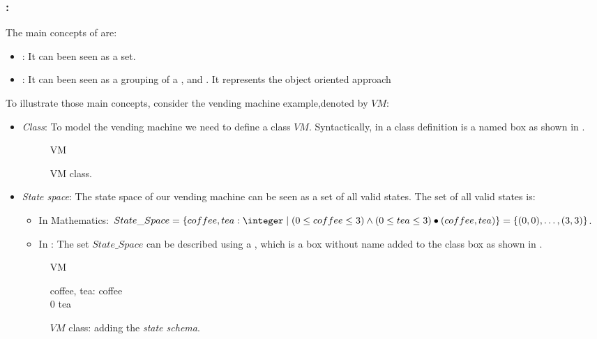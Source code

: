 \subsubsection{:} 
\label{main_concepts_oz} 
The main concepts of \oz{} are:
\begin{itemize}
\item {}: It can been seen as a set.
\item {}: It can been seen as a grouping of a  ,  and . It represents the object oriented approach 
\end{itemize}

To illustrate those main concepts, consider the vending machine example,denoted by $VM$:
\begin{itemize}
\item \textit{Class}: To model the vending machine we need to define a class $VM$. Syntactically, in \oz{}
a class definition is a named box as shown in .
\begin{figure}[H]
\centering
\begin{class}{VM}
\end{class}
\caption{VM class.}
\label{oz_VM_class}
\end{figure}
\item \textit{State space}: The state space of our vending machine can be seen as a set of all valid states. The set of all valid states is:
\begin{itemize}
\item In Mathematics: $State\_Space=\{coffee,tea: \integer\mid (0 \leq  coffee \leq 3) \wedge
(0 \leq  tea \leq 3)\bullet(coffee,tea)\}  =\{\pair{0}{0},\dots,\pair{3}{3}\}$.
\item In \oz{}: The set $State\_Space$ can be described using a , which is a box without name added to the class box as shown in .
\end{itemize}
\begin{figure}[H]
\centering
\begin{class}{VM}
\begin{state}
coffee, tea: \integer
{} \leq  coffee 
\\
0 \leq  tea 
\end{state} 
\end{class}
\caption{$VM$ class: adding the \textit{state schema}.}
\label{oz_VM_state}
\end{figure}

\end{itemize}

